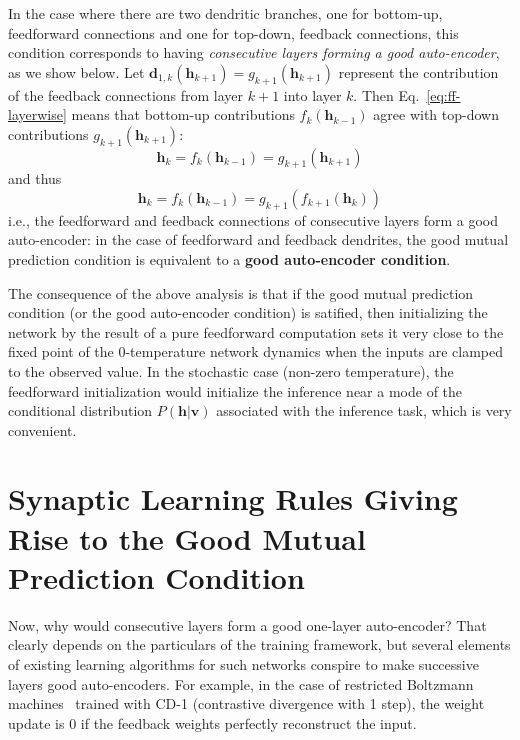 \documentclass{article}
\newcommand   \vv{{\bm v}}
\newcommand   \vh{{\bm h}}
\newcommand   \vd{{\bm d}}
\begin{document}
In the case where there are two dendritic branches, one for bottom-up, feedforward connections
and one for top-down, feedback connections, this condition corresponds to having {\em consecutive layers
  forming a good auto-encoder}, as we show below. Let $\vd_{1,k}(\vh_{k+1}) = g_{k+1}(\vh_{k+1})$ represent the
contribution of the feedback connections from layer $k+1$ into layer $k$.
Then Eq.~\ref{eq:ff-layerwise} means that bottom-up contributions $f_k(\vh_{k-1})$ agree
with top-down contributions $g_{k+1}(\vh_{k+1})$:
\begin{equation}
  \vh_k = f_k(\vh_{k-1}) = g_{k+1}(\vh_{k+1})
\end{equation}
and thus
\begin{equation}
  \vh_k = f_k(\vh_{k-1}) = g_{k+1}(f_{k+1}(\vh_k))
\end{equation}
i.e., the feedforward and feedback connections of consecutive layers form a good auto-encoder:
in the case of feedforward and feedback dendrites, the good mutual prediction condition
is equivalent to a {\bf good auto-encoder condition}.

The consequence of the above analysis is that if the good mutual prediction condition
(or the good auto-encoder condition) is satified, then initializing the network
by the result of a pure feedforward computation sets it very close to the
fixed point of the 0-temperature network dynamics when the inputs are clamped to the observed value.
In the stochastic case (non-zero temperature), the feedforward initialization would
initialize the inference near a mode of the conditional distribution $P(\vh | \vv)$
associated with the inference task, which is very convenient.

\section{Synaptic Learning Rules Giving Rise to the Good Mutual Prediction Condition}

Now, why would consecutive layers form a good one-layer auto-encoder?
That clearly depends on the particulars of the training framework, but
several elements of existing learning algorithms for such networks conspire
to make successive layers good auto-encoders. For example, in the case
of restricted Boltzmann machines~\citep{Hinton06} trained with CD-1 (contrastive divergence with 1 step),
the weight update is 0 if the feedback weights perfectly reconstruct the input.
\end{document}
